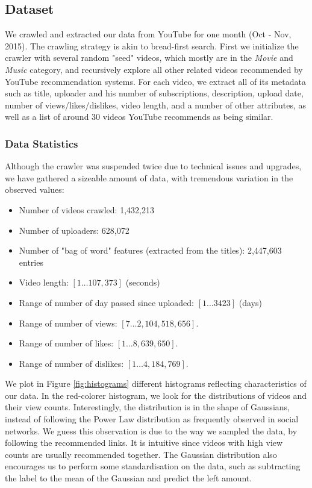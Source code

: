 \subsection{Dataset}
	We crawled and extracted our data from YouTube for one month (Oct - Nov, 2015). The crawling strategy is akin to bread-first search. First we initialize the crawler with several random "seed" videos, which mostly are in the \textit{Movie} and \textit{Music} category, and recursively explore all other related videos recommended by YouTube recommendation systems. For each video, we extract all of its metadata such as title, uploader and his number of subscriptions, description, upload date, number of views/likes/dislikes, video length, and a number of other attributes, as well as a list of around 30 videos YouTube recommends as being similar. 

	\subsubsection{Data Statistics}
		Although the crawler was suspended twice due to technical issues and upgrades, we have gathered a sizeable amount of data, with tremendous variation in the observed values:
		
		\begin{itemize}
			\item Number of videos crawled: 1,432,213
			\item Number of uploaders: 628,072
			\item Number of "bag of word" features (extracted from the titles): 2,447,603 entries
			\item Video length: $[1 \ldots 107,373]$ (seconds)
			\item Range of number of day passed since uploaded: $[1 \ldots 3423]$ (days)
			\item Range of number of views: $[7 \ldots 2,104,518,656]$.
			\item Range of number of likes: $[1 \ldots 8,639,650]$.
			\item Range of number of dislikes: $[1 \ldots 4,184,769]$.
		\end{itemize}

		We plot in Figure \ref{fig:histograms} different histograms reflecting characteristics of our data. In the red-colorer histogram, we look for the distributions of videos and their view counts. Interestingly, the distribution is in the shape of Gaussians, instead of following the Power Law distribution as frequently observed in social networks. We guess this observation is due to the way we sampled the data, by following the recommended links. It is intuitive since videos with high view counts are usually recommended together. The Gaussian distribution also encourages us to perform some standardisation on the data, such as subtracting the label to the mean of the Gaussian and predict the left amount. 
		

